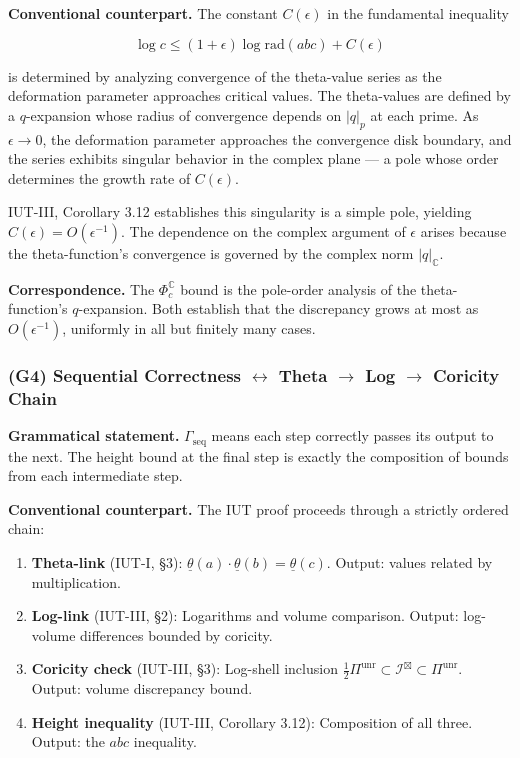 \documentclass[12pt,a4paper]{article}
\newcommand{\pilcrow}{\S}
\begin{document}
\textbf{Conventional counterpart.} The constant $C(\epsilon)$ in the fundamental inequality

\[\log c \leq (1 + \epsilon) \log \text{rad}(abc) + C(\epsilon)\]

is determined by analyzing convergence of the theta-value series as the deformation parameter approaches critical values. The theta-values are defined by a $q$-expansion whose radius of convergence depends on $|q|_p$ at each prime. As $\epsilon \to 0$, the deformation parameter approaches the convergence disk boundary, and the series exhibits singular behavior in the complex plane --- a pole whose order determines the growth rate of $C(\epsilon)$.

IUT-III, Corollary 3.12 establishes this singularity is a simple pole, yielding $C(\epsilon) = O(\epsilon^{-1})$. The dependence on the complex argument of $\epsilon$ arises because the theta-function's convergence is governed by the complex norm $|q|_\mathbb{C}$.

\textbf{Correspondence.} The $\Phi_c^\mathbb{C}$ bound is the pole-order analysis of the theta-function's $q$-expansion. Both establish that the discrepancy grows at most as $O(\epsilon^{-1})$, uniformly in all but finitely many cases.

\subsubsection{(G4) Sequential Correctness $\leftrightarrow$ Theta $\rightarrow$ Log $\rightarrow$ Coricity Chain}

\textbf{Grammatical statement.} $\Gamma_\text{seq}$ means each step correctly passes its output to the next. The height bound at the final step is exactly the composition of bounds from each intermediate step.

\textbf{Conventional counterpart.} The IUT proof proceeds through a strictly ordered chain:

\begin{enumerate}
    \item \textbf{Theta-link} (IUT-I, \pilcrow{}3): $\underline{\theta}(a) \cdot \underline{\theta}(b) = \underline{\theta}(c)$. Output: values related by multiplication.
    \item \textbf{Log-link} (IUT-III, \pilcrow{}2): Logarithms and volume comparison. Output: log-volume differences bounded by coricity.
    \item \textbf{Coricity check} (IUT-III, \pilcrow{}3): Log-shell inclusion $\frac{1}{2} \Pi^{\text{unr}} \subset \mathcal{I}^\boxtimes \subset \Pi^{\text{unr}}$. Output: volume discrepancy bound.
    \item \textbf{Height inequality} (IUT-III, Corollary 3.12): Composition of all three. Output: the $abc$ inequality.
\end{enumerate}
\end{document}
